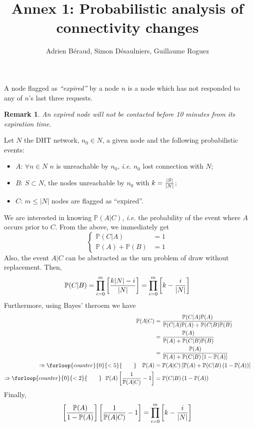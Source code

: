 \documentclass[11pt]{article}
\newcounter{counter}
\newtheorem{remark}{Remark}[section]
\renewcommand{\P}{\mathbb{P}}
\begin{document}
    \title{Annex 1: Probabilistic analysis of connectivity changes}
    \author{Adrien Béraud, Simon Désaulniers, Guillaume Roguez}
    \maketitle
    \pagestyle{empty}
    \begin{shadeDef}
        A node flagged as \emph{``expired''} by a node $n$ is a node which has not responded to any
        of $n$'s last three requests.
    \end{shadeDef}
    \begin{remark}
        An expired node will not be contacted before 10 minutes from its expiration time.
    \end{remark}

    Let $N$ the DHT network, $n_0\in N$, a given node and the following probabilistic events:
    \begin{itemize}
        \item $A$: $\forall n \in N$ $n$ is unreachable by $n_0$, \emph{i.e.} $n_0$ lost connection
            with $N$;
        \item $B$: $S\subset N$, the nodes unreachable by $n_0$ with $k={|S|\over|N|}$;
        \item $C$: $m \le |N|$ nodes are flagged as ``expired''.
    \end{itemize}

    We are interested in knowing $\P(A|C)$, \emph{i.e.} the probability of the event where $A$ occurs
    prior to $C$. From the above, we immediately get
    $$\left\{
        \begin{array}{ll}
            \P(C|A)       & = 1\\
            \P(A) + \P(B) & = 1
        \end{array}
    \right.$$
    Also, the event $A|C$ can be abstracted as the urn problem of draw without replacement. Then,
        $$\P(C|B) = \prod_{i=0}^m \left[k|N| - i \over |N|\right] = \prod_{i=0}^m \left[k - { i \over |N| }\right]$$
    Furthermore, using Bayes' theroem we have
    \begin{align*}
        \P(A|C) & = { \P(C|A)\P(A) \over \P(C|A)\P(A) + \P(C|B)\P(B)}\\
                & = { \P(A) \over \P(A) + \P(C|B)\P(B) }\\
                & = { \P(A) \over \P(A) + \P(C|B)\left[1 - \P(A)\right] }\\
        \Rightarrow \forloop{counter}{0}{\value{counter} < 5}{\qquad}\quad  \P(A)  & =
            \P(A|C)\left[\P(A) + \P(C|B)\left(1 - \P(A)\right) \right] \\
        \Rightarrow \forloop{counter}{0}{\value{counter} < 2}{\qquad}\;\:\, \P(A)\left[{ 1 \over \P(A|C)} - 1\right] & =
            \P(C|B)\left(1 - \P(A)\right) \\
    \end{align*}
    Finally,
    \begin{equation}
        \label{eq:final}
        \left[{\P(A) \over 1 - \P(A)}\right]\left[{ 1 \over \P(A|C)} - 1\right] =
            \prod_{i=0}^m \left[k - { i \over |N| }\right]
    \end{equation}
\end{document}
